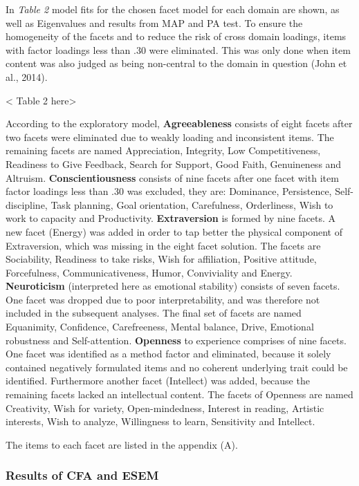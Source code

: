 \documentclass[,man,floatsintext]{apa6}
\theoremstyle{definition}
\theoremstyle{definition}
\theoremstyle{definition}
\theoremstyle{remark}
\begin{document}
In \emph{Table 2} model fits for the chosen facet model for each domain
are shown, as well as Eigenvalues and results from MAP and PA test. To
ensure the homogeneity of the facets and to reduce the risk of cross
domain loadings, items with factor loadings less than .30 were
eliminated. This was only done when item content was also judged as
being non-central to the domain in question (John et al., 2014).

\textless{} Table 2 here\textgreater{}

According to the exploratory model, \textbf{Agreeableness} consists of
eight facets after two facets were eliminated due to weakly loading and
inconsistent items. The remaining facets are named Appreciation,
Integrity, Low Competitiveness, Readiness to Give Feedback, Search for
Support, Good Faith, Genuineness and Altruism.
\textbf{Conscientiousness} consists of nine facets after one facet with
item factor loadings less than .30 was excluded, they are: Dominance,
Persistence, Self-discipline, Task planning, Goal orientation,
Carefulness, Orderliness, Wish to work to capacity and Productivity.
\textbf{Extraversion} is formed by nine facets. A new facet (Energy) was
added in order to tap better the physical component of Extraversion,
which was missing in the eight facet solution. The facets are
Sociability, Readiness to take risks, Wish for affiliation, Positive
attitude, Forcefulness, Communicativeness, Humor, Conviviality and
Energy. \textbf{Neuroticism} (interpreted here as emotional stability)
consists of seven facets. One facet was dropped due to poor
interpretability, and was therefore not included in the subsequent
analyses. The final set of facets are named Equanimity, Confidence,
Carefreeness, Mental balance, Drive, Emotional robustness and
Self-attention. \textbf{Openness} to experience comprises of nine
facets. One facet was identified as a method factor and eliminated,
because it solely contained negatively formulated items and no coherent
underlying trait could be identified. Furthermore another facet
(Intellect) was added, because the remaining facets lacked an
intellectual content. The facets of Openness are named Creativity, Wish
for variety, Open-mindedness, Interest in reading, Artistic interests,
Wish to analyze, Willingness to learn, Sensitivity and Intellect.

The items to each facet are listed in the appendix (A).

\hypertarget{results-of-cfa-and-esem}{%
\subsubsection{Results of CFA and ESEM}\label{results-of-cfa-and-esem}}
\end{document}
